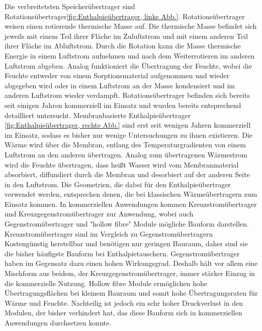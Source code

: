 \begin{normalsize}
\begin{LARGE}
Die verbreitetsten Speicherübertrager sind Rotationsübertrager\ref{fig:Enthalpieübertrager, linke Abb.}. Rotationsübertrager weisen einen rotierende thermische Masse auf. Die thermische Masse befindet sich jeweils mit einem Teil ihrer Fläche im Zuluftstrom und mit einem anderen Teil ihrer Fläche im Abluftstrom. Durch die Rotation kann die Masse thermische Energie in einem Luftstrom aufnehmen und nach dem Weiterrotieren im anderen Luftstrom abgeben. Analog funktioniert die Übertragung der Feuchte, wobei die Feuchte entweder von einem Sorptionsmaterial aufgenommen und wieder abgegeben wird oder in einem Luftstrom an der Masse kondensiert und im anderen Luftstrom wieder verdampft. Rotationsübertrager befinden sich bereits seit einigen Jahren kommerziell im Einsatz und wurden bereits entsprechend detailliert untersucht. %
Membranbasierte Enthalpieübertrager \ref{fig:Enthalpieübertrager, rechte Abb.} sind erst seit wenigen Jahren kommerziell im Einsatz, sodass es bisher nur wenige Untersuchungen zu ihnen existieren. Die Wärme wird über die Membran, entlang des Temperaturgradienten von einem Luftstrom an den anderen übertragen. Analog zum übertragenen Wärmestrom wird die Feuchte übertragen, dass heißt Wasser wird vom Membranmaterial absorbiert, diffundiert durch die Membran und desorbiert auf der anderen Seite in den Luftstrom. Die Geometrien, die dabei für den Enthalpieübertrager verwendet werden, entsprechen denen, die bei klassischen Wärmeübertragern zum Einsatz kommen. In kommerziellen Anwendungen kommen Kreuzstromübertrager und Kreuzgegenstromübertrager zur Anwendung, wobei auch Gegenstromübertrager und "hollow fibre" Module mögliche Bauform darstellen. Kreuzstromübertrager sind im Vergleich zu Gegenstromübertragern Kostengünstig herstellbar und benötigen nur geringen Bauraum, daher sind sie die bisher häufigste Bauform bei Enthalpietauschern. Gegenstromübertrager haben im Gegensatz dazu einen hohen Wirkungsgrad. Deshalb hält vor allem eine Mischform aus beidem, der Kreuzgegenstromübertrager, immer stärker Einzug in die kommerzielle Nutzung. Hollow fibre Module ermöglichen hohe Übertragungsflächen bei kleinem Bauraum und somit hohe Übertragungsraten für Wärme und Feuchte. Nachteilig ist jedoch ein sehr hoher Druckverlust in den Modulen, der bisher verhindert hat, das diese Bauform sich in kommerziellen Anwendungen durchsetzen konnte. 


\end{LARGE}
\end{normalsize}
